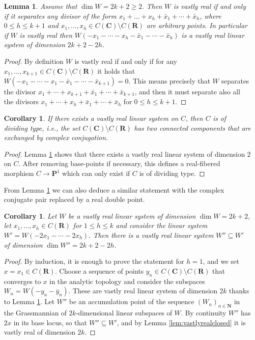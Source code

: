 \documentclass[12pt]{amsart}
\newcounter{conj}
\newcounter{thmcounter}
\numberwithin{equation}{section}
\numberwithin{thmcounter}{section}
\newtheorem{lemma}[thmcounter]{Lemma}
\newtheorem{corollary}[thmcounter]{Corollary}
\theoremstyle{definition}
\theoremstyle{claim}
\newcommand{\nN}{\mathbf{N}}
\newcommand{\nR}{\mathbf{R}}
\newcommand{\nC}{\mathbf{C}}
\newcommand{\nP}{\mathbf{P}}
\begin{document}
\begin{lemma}\label{lem:fixpair}
	Assume that $\dim W=2k+2 \geq 2$. Then $W$ is vastly real if and only if it separates any divisor of the form $x_1+\ldots+x_h+\bar{x}_1+\cdots+\bar{x}_{h}$, where $0\leq h\leq k+1$ and $x_1,\ldots,x_h\in C(\nC)\setminus C(\nR)$ are arbitrary points. In particular if $W$ is vastly real then $W(-x_1-\cdots-x_h-\bar{x}_1-\cdots-\bar{x}_h)$ is a vastly real linear system of dimension $2k+2-2h$.
\end{lemma}
\begin{proof}
	By definition $W$ is vastly real if and only if for any $x_1,\ldots,x_{k+1}\in C(\nC)\setminus C(\nR)$ it holds that $W(-x_1-\cdots- x_1-\bar{x}_{1}-\cdots - \bar{x}_{k+1}) = 0$. This means precisely that $W$ separates the divisor $x_1+\cdots+x_{k+1}+\bar{x}_{1}+\cdots + \bar{x}_{k+1}$, and then it must separate also all the divisors $x_1+\cdots+x_h+\bar{x}_1+\cdots+\bar{x}_h$ for $0\leq h\leq k+1$. 
\end{proof}


\begin{corollary}\label{cor:dividingtype}
    If there exists a vastly real linear system on $C$, then $C$ is of \emph{dividing type}, i.e., the set $C(\nC)\setminus C(\nR)$ has two connected components that are exchanged by complex conjugation.
\end{corollary}

\begin{proof}
 Lemma \ref{lem:fixpair} shows that there exists a vastly real linear system of dimension $2$ on $C$. After removing base-points if necessary, this defines a real-fibered morphism $C\to\nP^1$ which can only exist if $C$ is of dividing type.
\end{proof}

From Lemma \ref{lem:fixpair} we can also deduce a similar statement with the complex conjugate pair replaced by a real double point.

\begin{corollary}\label{cor:fixdouble}
    Let $W$ be a vastly real linear system of dimension $\dim W = 2k+2$, let $x_1,\ldots,x_h\in C(\nR)$ for $1\leq h\leq k$ and consider the linear system $W'=W(-2x_1-\cdots-2x_h)$.  Then there is a vastly real linear system $W''\subseteq W'$ of dimension $\dim W''=2k+2-2h$. 
\end{corollary}

\begin{proof}
   By induction, it is enough to prove the statement for $h=1$, and we set $x=x_1\in C(\nR)$.  Choose a sequence of points $y_n\in C(\nC)\setminus C(\nR)$ that converges to $x$ in the analytic topology and consider the subspaces $W_n=W(-y_n-\bar{y}_n)$. These are vastly real linear system of dimension $2k$ thanks to Lemma \ref{lem:fixpair}. Let $W''$ be an accumulation point of the sequence $(W_n)_{n\in\nN}$ in the Grassmannian of $2k$-dimensional linear subspaces of $W$. By continuity $W''$ has $2x$ in its base locus, so that $W''\subseteq W'$, and by Lemma \ref{lem:vastlyrealclosed} it is  vastly real of dimension $2k$.
\end{proof}
\end{document}

